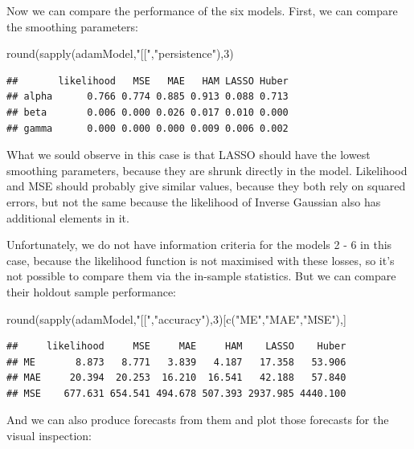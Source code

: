 \documentclass[
]{book}
\newenvironment{Shaded}{\begin{snugshade}}{\end{snugshade}}
\newcommand{\DecValTok}[1]{\textcolor[rgb]{0.00,0.00,0.81}{#1}}
\newcommand{\FunctionTok}[1]{\textcolor[rgb]{0.00,0.00,0.00}{#1}}
\newcommand{\NormalTok}[1]{#1}
\newcommand{\StringTok}[1]{\textcolor[rgb]{0.31,0.60,0.02}{#1}}
\theoremstyle{definition}
\theoremstyle{definition}
\theoremstyle{definition}
\theoremstyle{definition}
\theoremstyle{remark}
\begin{document}
Now we can compare the performance of the six models. First, we can compare the smoothing parameters:

\begin{Shaded}
\begin{Highlighting}[]
\FunctionTok{round}\NormalTok{(}\FunctionTok{sapply}\NormalTok{(adamModel,}\StringTok{"[["}\NormalTok{,}\StringTok{"persistence"}\NormalTok{),}\DecValTok{3}\NormalTok{)}
\end{Highlighting}
\end{Shaded}

\begin{verbatim}
##       likelihood   MSE   MAE   HAM LASSO Huber
## alpha      0.766 0.774 0.885 0.913 0.088 0.713
## beta       0.006 0.000 0.026 0.017 0.010 0.000
## gamma      0.000 0.000 0.000 0.009 0.006 0.002
\end{verbatim}

What we sould observe in this case is that LASSO should have the lowest smoothing parameters, because they are shrunk directly in the model. Likelihood and MSE should probably give similar values, because they both rely on squared errors, but not the same because the likelihood of Inverse Gaussian also has additional elements in it.

Unfortunately, we do not have information criteria for the models 2 - 6 in this case, because the likelihood function is not maximised with these losses, so it's not possible to compare them via the in-sample statistics. But we can compare their holdout sample performance:

\begin{Shaded}
\begin{Highlighting}[]
\FunctionTok{round}\NormalTok{(}\FunctionTok{sapply}\NormalTok{(adamModel,}\StringTok{"[["}\NormalTok{,}\StringTok{"accuracy"}\NormalTok{),}\DecValTok{3}\NormalTok{)[}\FunctionTok{c}\NormalTok{(}\StringTok{"ME"}\NormalTok{,}\StringTok{"MAE"}\NormalTok{,}\StringTok{"MSE"}\NormalTok{),]}
\end{Highlighting}
\end{Shaded}

\begin{verbatim}
##     likelihood     MSE     MAE     HAM    LASSO    Huber
## ME       8.873   8.771   3.839   4.187   17.358   53.906
## MAE     20.394  20.253  16.210  16.541   42.188   57.840
## MSE    677.631 654.541 494.678 507.393 2937.985 4440.100
\end{verbatim}

And we can also produce forecasts from them and plot those forecasts for the visual inspection:
\end{document}
